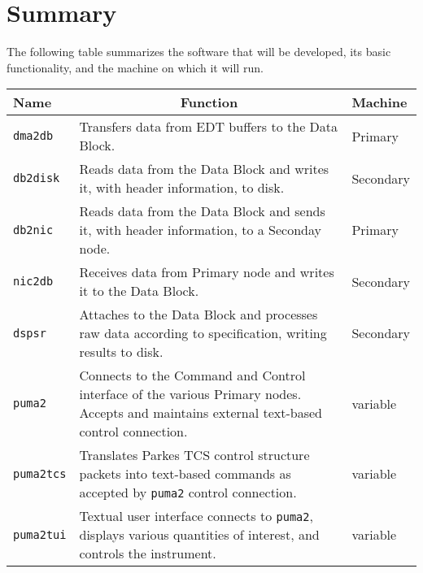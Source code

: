 \chapter{Summary}

The following table summarizes the software that will be developed,
its basic functionality, and the machine on which it will run.

\vspace{5mm}

\begin{tabular}{l|p{8cm}|l}

Name & \multicolumn{1}{c}{Function} & Machine \\ \hline

{\tt dma2db} & Transfers data from EDT buffers to the Data Block.
	& Primary \\

{\tt db2disk} & Reads data from the Data Block and writes it, with
	header information, to disk. & Secondary \\

{\tt db2nic} & Reads data from the Data Block and sends it, with
	header information, to a Seconday node. & Primary \\

{\tt nic2db} & Receives data from Primary node and writes it to the 
	Data Block. & Secondary \\

{\tt dspsr} & Attaches to the Data Block and processes raw data
	according to specification, writing results to disk. &
	Secondary \\

{\tt puma2} & Connects to the Command and Control interface of the
	various Primary nodes.  Accepts and maintains external
	text-based control connection.  & variable \\

{\tt puma2tcs} & Translates Parkes TCS control structure packets into
	text-based commands as accepted by {\tt puma2} control
	connection.  & variable \\

{\tt puma2tui} & Textual user interface connects to {\tt puma2},
	displays various quantities of interest, and controls
	the instrument. & variable \\

\end{tabular}

